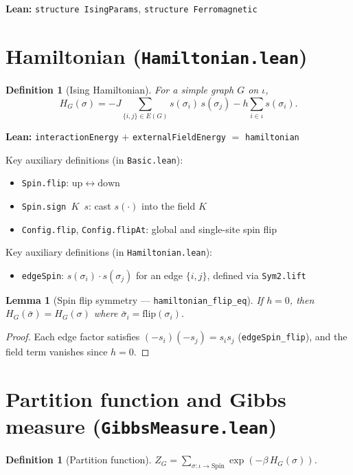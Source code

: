 \documentclass[a4paper,11pt]{article}
\newtheorem{lemma}[theorem]{Lemma}
\newtheorem{definition}[theorem]{Definition}
\begin{document}
\noindent\textbf{Lean:} \texttt{structure IsingParams},
\texttt{structure Ferromagnetic}

\section{Hamiltonian (\texttt{Hamiltonian.lean})}

\begin{definition}[Ising Hamiltonian]
For a simple graph $G$ on $\iota$,
\[
  H_G(\sigma) = -J \sum_{\{i,j\} \in E(G)} s(\sigma_i)\,s(\sigma_j)
  - h \sum_{i \in \iota} s(\sigma_i).
\]
\end{definition}

\noindent\textbf{Lean:} \texttt{interactionEnergy} $+$
\texttt{externalFieldEnergy} $=$ \texttt{hamiltonian}

Key auxiliary definitions (in \texttt{Basic.lean}):
\begin{itemize}
  \item \texttt{Spin.flip}: $\mathrm{up} \leftrightarrow \mathrm{down}$
  \item \texttt{Spin.sign $K$ $s$}: cast $s(\cdot)$ into the field $K$
  \item \texttt{Config.flip}, \texttt{Config.flipAt}: global and single-site spin flip
\end{itemize}
Key auxiliary definitions (in \texttt{Hamiltonian.lean}):
\begin{itemize}
  \item \texttt{edgeSpin}: $s(\sigma_i) \cdot s(\sigma_j)$ for an edge
    $\{i,j\}$, defined via \texttt{Sym2.lift}
\end{itemize}

\begin{lemma}[Spin flip symmetry --- \texttt{hamiltonian\_flip\_eq}]
If $h = 0$, then $H_G(\bar{\sigma}) = H_G(\sigma)$ where
$\bar{\sigma}_i = \mathrm{flip}(\sigma_i)$.
\end{lemma}

\begin{proof}
Each edge factor satisfies $(-s_i)(-s_j) = s_i s_j$
(\texttt{edgeSpin\_flip}), and the field term vanishes since $h=0$.
\end{proof}

\section{Partition function and Gibbs measure (\texttt{GibbsMeasure.lean})}

\begin{definition}[Partition function]
$Z_G = \sum_{\sigma : \iota \to \mathrm{Spin}} \exp(-\beta\, H_G(\sigma))$.
\end{definition}
\end{document}
